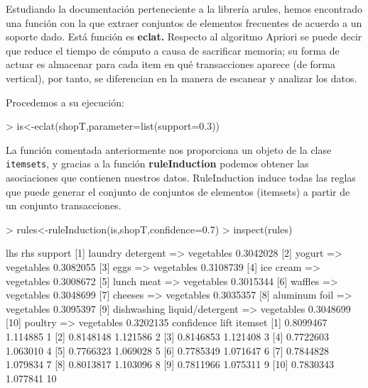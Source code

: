\documentclass [a4paper] {article}
\begin{document}
{\bigskip
Estudiando la documentación perteneciente a la librería arules, hemos encontrado una función con la que extraer
conjuntos de elementos frecuentes de acuerdo a un soporte dado. Está función es \textbf{eclat.}
Respecto al algoritmo Apriori se puede decir que reduce el tiempo de cómputo a causa de sacrificar memoria; su
forma de actuar es almacenar para cada item en qué transacciones aparece (de forma vertical), por tanto, 
se diferencian en la manera de escanear y analizar los datos.

\bigskip
Procedemos a su ejecución:
\begin{Schunk}
\begin{Sinput}
> is<-eclat(shopT,parameter=list(support=0.3))
\end{Sinput}
\end{Schunk}

\bigskip
La función comentada anteriormente nos proporciona un objeto de la clase \texttt{itemsets}, y gracias a la función
\textbf{ruleInduction} podemos obtener las asociaciones que contienen nuestros datos. RuleInduction induce todas las reglas 
que puede generar el conjunto de conjuntos de elementos (itemsets) a partir de un conjunto transacciones.
\begin{Schunk}
\begin{Sinput}
> rules<-ruleInduction(is,shopT,confidence=0.7)
> inspect(rules)
\end{Sinput}
\begin{Soutput}
     lhs                               rhs          support  
[1]  {laundry detergent}            => {vegetables} 0.3042028
[2]  {yogurt}                       => {vegetables} 0.3082055
[3]  {eggs}                         => {vegetables} 0.3108739
[4]  {ice cream}                    => {vegetables} 0.3008672
[5]  {lunch meat}                   => {vegetables} 0.3015344
[6]  {waffles}                      => {vegetables} 0.3048699
[7]  {cheeses}                      => {vegetables} 0.3035357
[8]  {aluminum foil}                => {vegetables} 0.3095397
[9]  {dishwashing liquid/detergent} => {vegetables} 0.3048699
[10] {poultry}                      => {vegetables} 0.3202135
     confidence lift     itemset
[1]  0.8099467  1.114885  1     
[2]  0.8148148  1.121586  2     
[3]  0.8146853  1.121408  3     
[4]  0.7722603  1.063010  4     
[5]  0.7766323  1.069028  5     
[6]  0.7785349  1.071647  6     
[7]  0.7844828  1.079834  7     
[8]  0.8013817  1.103096  8     
[9]  0.7811966  1.075311  9     
[10] 0.7830343  1.077841 10     
\end{Soutput}
\end{Schunk}

}
\end{document}
